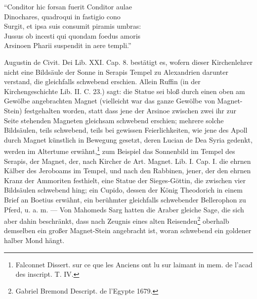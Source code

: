 \documentclass[a4paper, 11pt, oneside, polutonikogreek, german]{article}
\begin{document}
"`Conditor hic forsan fuerit Conditor aulae\\
\hspace*{0.5cm} Dinochares, quadroqui in fastigio cono\\
\hspace*{0.5cm} Surgit, et ipsa suis consumit piramis umbras:\\
\hspace*{0.5cm} Jussus ob incesti qui quondam foedus amoris\\
\hspace*{0.5cm} Arsinoen Pharii suspendit in aere templi."'

Augustin de Civit. Dei Lib. XXI. Cap. 8. bestätigt es, wofern dieser Kirchenlehrer nicht eine Bildsäule der Sonne in Serapis Tempel zu Alexandrien darunter verstand, die gleichfalls schwebend erschien. Allein Ruffin (in der Kirchengeschichte Lib. II. C. 23.) sagt: die Statue sei bloß durch einen oben am Gewölbe angebrachten Magnet (vielleicht war das ganze Gewölbe von Magnet-Stein) festgehalten worden, statt dass jene der Arsinoe zwischen zwei ihr zur Seite stehenden Magneten gleichsam schwebend erschien; mehrere solche Bildsäulen, teils schwebend, teils bei gewissen Feierlichkeiten, wie jene des Apoll durch Magnet künstlich in Bewegung gesetzt, deren Lucian de Dea Syria gedenkt, werden im Altertume erwähnt,\footnote{Falconnet Dissert. sur ce que les Anciens ont lu sur laimant in mem. de l'acad des inscript. T. IV.} zum Beispiel das Sonnenbild im Tempel des Serapis, der Magnet, der, nach Kircher de Art. Magnet. Lib. I. Cap. I. die ehrnen Kälber des Jeroboams im Tempel, und nach den Rabbinen, jener, der den ehrnen Kranz der Ammoriten festhielt, eine Statue der Sieges-Göttin, die zwischen vier Bildsäulen schwebend hing; ein Cupido, dessen der König Theodorich in einem Brief an Boetius erwähnt, ein berühmter gleichfalls schwebender Bellerophon zu Pferd, u. a. m. --- Von Mahomeds Sarg hatten die Araber gleiche Sage, die sich aber dahin beschränkt, dass nach Zeugnis eines alten Reisenden\footnote{Gabriel Bremond Descript. de l'Egypte 1679.} oberhalb demselben ein großer Magnet-Stein angebracht ist, woran schwebend ein goldener halber Mond hängt.
\end{document}
